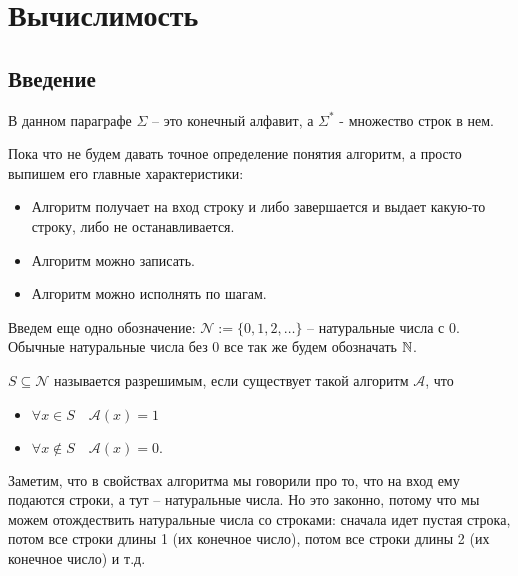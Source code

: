 \section{Вычислимость}
\subsection{Введение}
В данном параграфе $\Sigma$ -- это конечный алфавит, а $\Sigma^*$ - множество строк в нем.

Пока что не будем давать точное определение понятия алгоритм, а просто выпишем его главные характеристики: 
\begin{itemize}
    \item Алгоритм получает на вход строку и либо завершается и выдает какую-то строку, либо не останавливается.
    \item Алгоритм можно записать.
    \item Алгоритм можно исполнять по шагам.
\end{itemize}
Введем еще одно обозначение: $\mathcal{N} := \{0, 1, 2, \dots \}$ -- натуральные числа с 0. Обычные натуральные числа без 0 все так же будем обозначать $\mathbb{N}$.

\begin{conj}
    $S \subseteq \mathcal{N}$ называется разрешимым, если существует такой алгоритм $\mathcal{A}$, что \begin{itemize}
        \item $\forall x \in S \quad \mathcal{A}(x) = 1$
        \item $\forall x \notin S \quad \mathcal{A}(x) = 0.$
    \end{itemize}
\end{conj}
Заметим, что в свойствах алгоритма мы говорили про то, что на вход ему подаются строки, а тут -- натуральные числа. Но это законно, потому что мы можем отождествить натуральные числа со строками: сначала идет пустая строка, потом все строки длины 1 (их конечное число), потом все строки длины 2 (их конечное число) и т.д.

